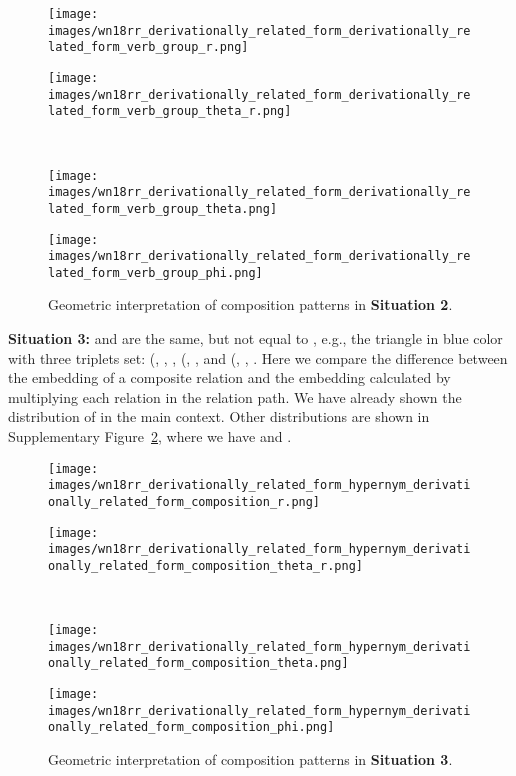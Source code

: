 \documentclass[11pt]{article}
\begin{document}
\begin{figure}[htbp]
\centering
\begin{minipage}{3.5cm}
\centering
\texttt{[image: images/wn18rr\_derivationally\_related\_form\_derivationally\_related\_form\_verb\_group\_r.png]}
\subcaption{\tiny{}}
\end{minipage}
\begin{minipage}{3.5cm}
\centering
\texttt{[image: images/wn18rr\_derivationally\_related\_form\_derivationally\_related\_form\_verb\_group\_theta\_r.png]}
\subcaption{\tiny{}}
\end{minipage}
\\
\begin{minipage}{3.5cm}
\centering
\texttt{[image: images/wn18rr\_derivationally\_related\_form\_derivationally\_related\_form\_verb\_group\_theta.png]}
\subcaption{\tiny{}}
\end{minipage}
\begin{minipage}{3.5cm}
\centering
\texttt{[image: images/wn18rr\_derivationally\_related\_form\_derivationally\_related\_form\_verb\_group\_phi.png]}
\subcaption{\tiny{}}
\end{minipage}
\caption{Geometric interpretation of composition patterns in \textbf{Situation 2}.}
\label{119}
\end{figure}

\textbf{Situation 3:}  and  are the same, but not equal to , e.g., the triangle in blue color with three triplets set: (,
, , (, ,  and (, , . Here we compare the difference between the embedding of a composite relation and the embedding calculated by multiplying each relation in the relation path. We have already shown the distribution of  in the main context. Other distributions are shown in Supplementary Figure~\ref{101}, where we have  and .

\begin{figure}[htbp]
\centering
\begin{minipage}{3.5cm}
\centering
\texttt{[image: images/wn18rr\_derivationally\_related\_form\_hypernym\_derivationally\_related\_form\_composition\_r.png]}
\subcaption{\tiny{}}
\end{minipage}
\begin{minipage}{3.5cm}
\centering
\texttt{[image: images/wn18rr\_derivationally\_related\_form\_hypernym\_derivationally\_related\_form\_composition\_theta\_r.png]}
\subcaption{\tiny{}}
\end{minipage}
\\
\begin{minipage}{3.5cm}
\centering
\texttt{[image: images/wn18rr\_derivationally\_related\_form\_hypernym\_derivationally\_related\_form\_composition\_theta.png]}
\subcaption{\tiny{}}
\end{minipage}
\begin{minipage}{3.5cm}
\centering
\texttt{[image: images/wn18rr\_derivationally\_related\_form\_hypernym\_derivationally\_related\_form\_composition\_phi.png]}
\subcaption{\tiny{}}
\end{minipage}
\caption{Geometric interpretation of composition patterns in \textbf{Situation 3}.}
\label{101}
\end{figure}
\end{document}
